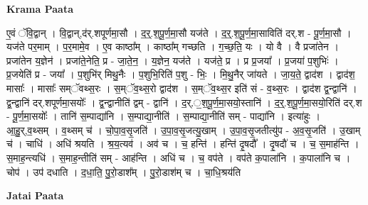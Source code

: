 \documentclass[17pt]{extarticle}
\begin{document}
\textbf{Krama Paata} \newline

ए॒वं ॅवि॒द्वान् । वि॒द्वान्,द॑र्.शपूर्णमा॒सौ । द॒र्॒.श॒पू॒र्ण॒मा॒सौ यज॑ते । द॒र्॒.श॒पू॒र्ण॒मा॒साविति॑ दर्.श - पू॒र्ण॒मा॒सौ । यज॑ते पर॒माम् । प॒र॒मामे॒व । ए॒व काष्ठा᳚म् । काष्ठा᳚म् गच्छति । ग॒च्छ॒ति॒ यः । यो वै । वै प्रजा॑तेन । प्रजा॑तेन य॒ज्ञेन॑ । प्रजा॑ते॒नेति॒ प्र - जा॒ते॒न॒ । य॒ज्ञेन॒ यज॑ते । यज॑ते॒ प्र । प्र प्र॒जया᳚ । प्र॒जया॑ प॒शुभिः॑ । प्र॒जयेति॑ प्र - जया᳚ । प॒शुभि॑र् मिथु॒नैः । प॒शुभि॒रिति॑ प॒शु - भिः॒ । मि॒थु॒नैर् जा॑यते । जा॒य॒ते॒ द्वाद॑श । द्वाद॑श॒ मासाः᳚ । मासाः᳚ सम्ॅवथ्स॒रः । स॒म्ॅव॒थ्स॒रो द्वाद॑श । स॒म्ॅव॒थ्स॒र इति॑ सं - व॒थ्स॒रः । द्वाद॑श द्व॒न्द्वानि॑ । द्व॒न्द्वानि॑ दर्.शपूर्णमा॒सयोः᳚ । द्व॒न्द्वानीति॑ द्वम् - द्वानि॑ । द॒र्.॒श॒पू॒र्ण॒मा॒सयो॒स्तानि॑ । द॒र्॒.श॒पू॒र्ण॒मा॒सयो॒रिति॑ दर्.श - पू॒र्ण॒मा॒सयोः᳚ । तानि॑ स॒म्पाद्या॑नि । स॒म्पाद्या॒नीति॑ । स॒म्पाद्या॒नीति॑ सम् - पाद्या॑नि । इत्या॑हुः । आ॒हु॒र्,व॒थ्सम् । व॒थ्सम् च॑ । चो॒पा॒व॒सृ॒जति॑ । उ॒पा॒व॒सृ॒जत्यु॒खाम् । उ॒पा॒व॒सृ॒जतीत्यु॑प - अ॒व॒सृ॒जति॑ । उ॒खाम् च॑ । चाधि॑ । अधि॑ श्रयति । श्र॒य॒त्यव॑ । अव॑ च । च॒ हन्ति॑ । हन्ति॑ दृ॒षदौ᳚ । दृ॒षदौ॑ च । च॒ स॒माह॑न्ति । स॒माह॒न्त्यधि॑ । स॒माह॒न्तीति॑ सम् - आह॑न्ति । अधि॑ च । च॒ वप॑ते । वप॑ते क॒पाला॑नि । क॒पाला॑नि च । चोप॑ । उप॑ दधाति । द॒धा॒ति॒ पु॒रो॒डाश᳚म् । पु॒रो॒डाश॑म् च । चा॒धि॒श्रय॑ति \newline

\textbf{Jatai Paata} \newline
\end{document}
